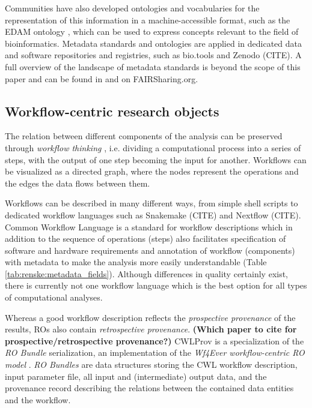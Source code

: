 Communities have also developed ontologies and vocabularies for the representation of this information in a machine-accessible format, such as the EDAM ontology \cite{Ison2013}, which can be used to express concepts relevant to the field of bioinformatics. Metadata standards and ontologies are applied in dedicated data and software repositories and registries, such as bio.tools \cite{isonBioToolsRegistry2019} and Zenodo (CITE). A full overview of the landscape of metadata standards is beyond the scope of this paper and can be found in \cite{leipzigRoleMetadataReproducible2021} and on FAIRSharing.org.

\subsection{Workflow-centric research objects}

The relation between different components of the analysis can be preserved through \emph{workflow thinking} \cite{gryk_workflows_2017}, i.e. dividing a computational process into a series of steps, with the output of one step becoming the input for another. Workflows can be visualized as a directed graph, where the nodes represent the operations and the edges the data flows between them.

Workflows can be described in many different ways, from simple shell scripts to dedicated workflow languages such as Snakemake (CITE) and Nextflow (CITE). Common Workflow Language \cite{crusoe-methods-2022} is a standard for workflow descriptions which in addition to the sequence of operations (steps) also facilitates specification of software and hardware requirements and annotation of workflow (components) with metadata to make the analysis more easily understandable (Table \ref{tab:renske:metadata_fields}). Although differences in quality certainly exist, there is currently not one workflow language which is the best option for all types of computational analyses.


Whereas a good workflow description reflects the \emph{prospective provenance} of the results, ROs \cite{bechhoferWhyLinkedData2011} also contain \emph{retrospective provenance}. \textbf{(Which paper to cite for prospective/retrospective provenance?) } CWLProv is a specialization of the \emph{RO Bundle} serialization, an implementation of the \emph{Wf4Ever workflow-centric RO model} \cite{belhajjame_2012}. \emph{RO Bundles} are data structures storing the CWL workflow description, input parameter file, all input and (intermediate) output data, and the provenance record describing the relations between the contained data entities and the workflow. 

